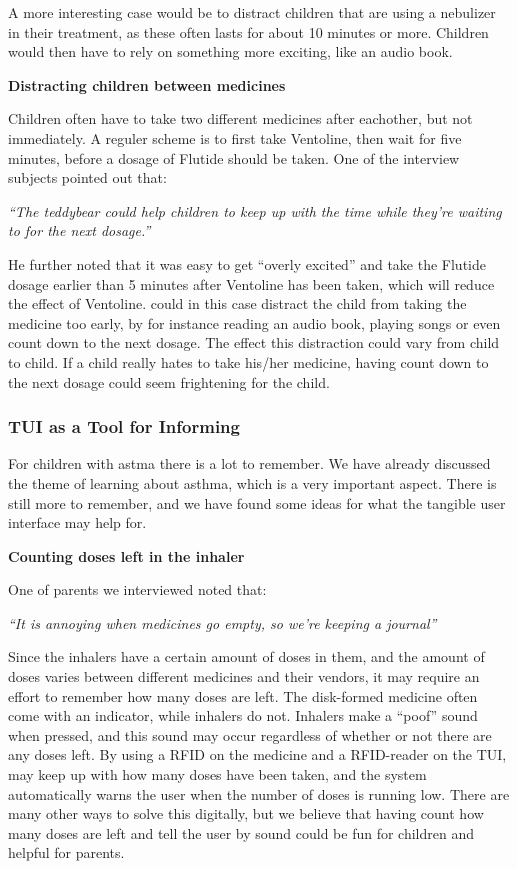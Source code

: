 A more interesting case would be to distract children that are using a nebulizer in their treatment, as these often lasts for about 10 minutes or more. Children would then have to rely on something more exciting, like an audio book. 

\textbf{Distracting children between medicines}

Children often have to take two different medicines after eachother, but not immediately. A reguler scheme is to first take Ventoline, then wait for five minutes, before a dosage of Flutide should be taken. One of the interview subjects pointed out that: 

\textit{``The teddybear could help children to keep up with the time while they're waiting to for the next dosage.''}

He further noted that it was easy to get ``overly excited'' and take the Flutide dosage earlier than 5 minutes after Ventoline has been taken, which will reduce the effect of Ventoline. \ab{} could in this case distract the child from taking the medicine too early, by for instance reading an audio book, playing songs or even count down to the next dosage. The effect this distraction could vary from child to child. If a child really hates to take his/her medicine, having \ab{} count down to the next dosage could seem frightening for the child.   
  

\subsubsection{TUI as a Tool for Informing}
\label{sec:tuiasatoolforinforming}
For children with astma there is a lot to remember. We have already discussed the theme of learning about asthma, which is a very important aspect. There is still more to remember, and we have found some ideas for what the tangible user interface may help for. 

\textbf{Counting doses left in the inhaler}

One of parents we interviewed noted that: 

\textit{``It is annoying when medicines go empty, so we're keeping a journal''}

Since the inhalers have a certain amount of doses in them, and the amount of doses varies between different medicines and their vendors, it may require an effort to remember how many doses are left. The disk-formed medicine often come with an indicator, while inhalers do not. Inhalers make a ``poof'' sound when pressed, and this sound may occur regardless of whether or not there are any doses left. By using a RFID on the medicine and a RFID-reader on the TUI, may keep up with how many doses have been taken, and the system automatically warns the user when the number of doses is running low. There are many other ways to solve this digitally, but we believe that having \buddy{} count how many doses are left and  tell the user by sound could be fun for children and helpful for parents.


